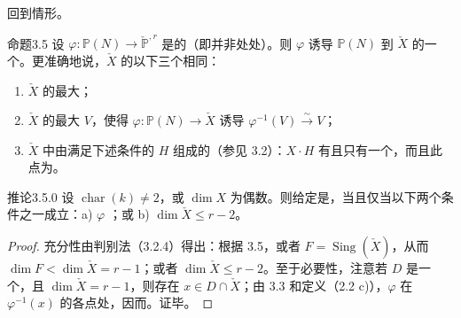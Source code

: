 回到情形。

\begin{SGAresult}{命题}{3.5}
设 $\varphi:\mathbb P(N)\to\check{\mathbb P}^{,r}$ 是的（即并非处处）。则 $\varphi$ 诱导 $\mathbb P(N)$ 到 $\check X$ 的一个。更准确地说，$\check X$ 的以下三个相同：
\begin{enumerate}
\item[a)] $\check X$ 的最大；
\item[b)] $\check X$ 的最大 $V$，使得 $\varphi:\mathbb P(N)\to\check X$ 诱导 $\varphi^{-1}(V)\xrightarrow{\sim}V$；
\item[c)] $\check X$ 中由满足下述条件的 $H$ 组成的（参见 3.2）：$X\cdot H$ 有且只有一个，而且此点为。
\end{enumerate}
\end{SGAresult}

\begin{SGAresult}{推论}{3.5.0}
设 $\operatorname{char}(k)\ne2$，或 $\dim X$ 为偶数。则给定是，当且仅当以下两个条件之一成立：a) $\varphi$ ；或 b) $\dim\check X\leq r-2$。
\end{SGAresult}
\begin{proof}
充分性由判别法（3.2.4）得出：根据 3.5，或者 $F=\operatorname{Sing}(\check X)$，从而 $\dim F<\dim\check X=r-1$；或者 $\dim\check X\leq r-2$。至于必要性，注意若 $D$ 是一个，且 $\dim\check X=r-1$，则存在 $x\in D\cap\check X$；由 3.3 和定义（2.2 c)），$\varphi$ 在 $\varphi^{-1}(x)$ 的各点处，因而。证毕。
\end{proof}


